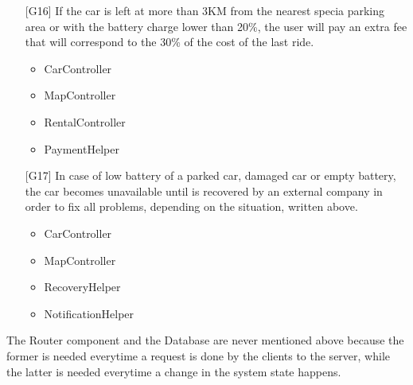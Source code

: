 \begin{itemize}
	\item[{[G16]}] If the car is left at more than 3KM from the nearest specia parking area or with the battery charge lower than 20\%, the user will pay an extra fee that will correspond to the 30\% of the cost of the last ride.
		\begin{itemize}
			\item CarController
			\item MapController
			\item RentalController
			\item PaymentHelper
		\end{itemize}
	\item[{[G17]}] In case of low battery of a parked car, damaged car or empty battery, the car becomes unavailable until is recovered by an external company in order to fix all problems, depending on the situation, written above. 
		\begin{itemize}
			\item CarController
			\item MapController
			\item RecoveryHelper
			\item NotificationHelper
		\end{itemize}
\end{itemize}

The Router component and the Database are never mentioned above because the former is needed everytime a request is done by the clients to the server, while the latter is needed everytime a change in the system state happens.
